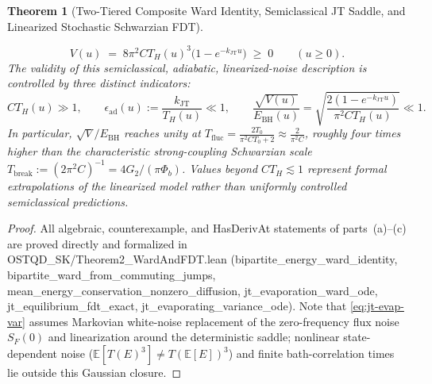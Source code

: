 \documentclass[11pt,a4paper]{article}
\newtheorem{theorem}{Theorem}
\theoremstyle{definition}
\theoremstyle{remark}
\newcommand{\1}{\mathbf{1}}
\newcommand{\code}[1]{{\scriptsize\ttfamily #1}}
\begin{document}
\begin{theorem}[Two-Tiered Composite Ward Identity, Semiclassical JT Saddle, and Linearized Stochastic Schwarzian FDT]
\begin{enumerate}
\begin{enumerate}
    \begin{equation}\label{eq:jt-evap-var}
      V(u) \;=\; 8\pi^2 C T_H(u)^3 \bigl(1 - e^{-k_{\mathrm{JT}} u}\bigr) \;\ge\; 0 \qquad (u \ge 0).
    \end{equation}
    The validity of this semiclassical, adiabatic, linearized-noise description is controlled by \emph{three distinct indicators}:
    \begin{equation}\label{eq:jt-indicators}
      C T_H(u) \gg 1, \qquad
      \epsilon_{\mathrm{ad}}(u) := \frac{k_{\mathrm{JT}}}{T_H(u)} \ll 1, \qquad
      \frac{\sqrt{V(u)}}{E_{\mathrm{BH}}(u)} = \sqrt{\frac{2(1-e^{-k_{\mathrm{JT}}u})}{\pi^2 C T_H(u)}} \ll 1.
    \end{equation}
    In particular, $\sqrt{V}/E_{\mathrm{BH}}$ reaches unity at $T_{\mathrm{fluc}} = \frac{2 T_0}{\pi^2 C T_0 + 2} \approx \frac{2}{\pi^2 C}$, roughly four times higher than the characteristic strong-coupling Schwarzian scale $T_{\mathrm{break}} := (2\pi^2 C)^{-1} = 4G_2/(\pi\Phi_b)$. Values beyond $CT_H\lesssim 1$ represent formal extrapolations of the linearized model rather than uniformly controlled semiclassical predictions.
  \end{enumerate}
\end{enumerate}
\end{theorem}

\begin{proof}
All algebraic, counterexample, and \code{HasDerivAt} statements of parts~(a)--(c) are proved directly and formalized in \code{OSTQD\_\allowbreak SK/\allowbreak Theorem2\_\allowbreak WardAndFDT.lean} (\code{bipartite\_\allowbreak energy\_\allowbreak ward\_\allowbreak identity}, \code{bipartite\_\allowbreak ward\_\allowbreak from\_\allowbreak commuting\_\allowbreak jumps}, \code{mean\_\allowbreak energy\_\allowbreak conservation\_\allowbreak nonzero\_\allowbreak diffusion}, \code{jt\_\allowbreak evaporation\_\allowbreak ward\_\allowbreak ode}, \code{jt\_\allowbreak equilibrium\_\allowbreak fdt\_\allowbreak exact}, \code{jt\_\allowbreak evaporating\_\allowbreak variance\_\allowbreak ode}). Note that \eqref{eq:jt-evap-var} assumes Markovian white-noise replacement of the zero-frequency flux noise $S_F(0)$ and linearization around the deterministic saddle; nonlinear state-dependent noise ($\mathbb{E}[T(E)^3]\neq T(\mathbb{E}[E])^3$) and finite bath-correlation times lie outside this Gaussian closure.
\end{proof}
\end{document}
